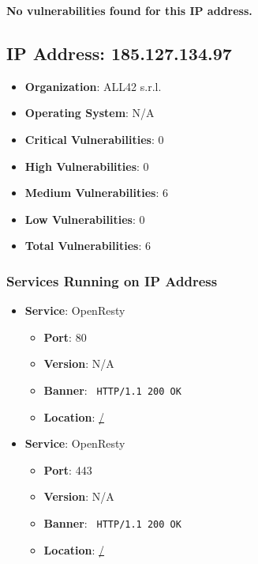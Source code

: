 \documentclass{article}
\begin{document}
\textbf{No vulnerabilities found for this IP address.}


\clearpage



\subsection*{IP Address: 185.127.134.97}

\begin{itemize}
    \item \textbf{Organization}: ALL42 s.r.l.
    \item \textbf{Operating System}:  N/A 
    \item \textbf{Critical Vulnerabilities}: 0
    \item \textbf{High Vulnerabilities}: 0
    \item \textbf{Medium Vulnerabilities}: 6
    \item \textbf{Low Vulnerabilities}: 0
    \item \textbf{Total Vulnerabilities}: 6
\end{itemize}

\subsubsection*{Services Running on IP Address}

\begin{itemize}
    
        \item \textbf{Service}: OpenResty
        \begin{itemize}
            \item \textbf{Port}: 80
            \item \textbf{Version}:  N/A 
            \item \textbf{Banner}: \texttt{ HTTP/1.1 200 OK
 }
            \item \textbf{Location}: \href{ / }{ / }
        \end{itemize}
    
        \item \textbf{Service}: OpenResty
        \begin{itemize}
            \item \textbf{Port}: 443
            \item \textbf{Version}:  N/A 
            \item \textbf{Banner}: \texttt{ HTTP/1.1 200 OK
 }
            \item \textbf{Location}: \href{ / }{ / }
        \end{itemize}
    
\end{itemize}
\end{document}
